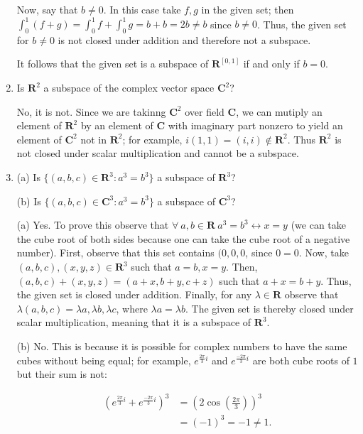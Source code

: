 \documentclass{book}
\begin{document}
\begin{enumerate}
Now, say that \(b \neq 0\).  In this case take \(f,g\) in the given set; then \(\int_{0}^{1} (f+g)=\int_{0}^{1} f+\int_{0}^{1} g=b+b=2b \neq b\) since \(b \neq 0\).  Thus, the given set for \(b \neq 0\) is not closed under addition and therefore not a subspace.

It follows that the given set is a subspace of \(\textbf{R}^{[0,1]}\) if and only if \(b=0\).

\item Is \(\textbf{R}^2\) a subspace of the complex vector space \(\textbf{C}^2\)?

No, it is not.  Since we are takinng \(\textbf{C}^2\) over field \(\textbf{C}\), we can mutiply an element of \(\textbf{R}^2\) by an element of \(\textbf{C}\) with imaginary part nonzero to yield an element of \(\textbf{C}^2\) not in \(\textbf{R}^2\); for example, \(i(1,1)=(i,i) \notin \textbf{R}^2\).  Thus \(\textbf{R}^2\) is not closed under scalar multiplication and  cannot be a subspace.

\item (a) Is \(\{(a,b,c) \in \textbf{R}^3:a^3=b^3\}\) a subspace of \(\textbf{R}^3\)?

(b) Is \(\{(a,b,c) \in \textbf{C}^3:a^3=b^3\}\) a subspace of \(\textbf{C}^3\)?

(a) Yes.  To prove this observe that \(\forall \ a,b \in \textbf{R} \ a^3=b^3 \leftrightarrow x=y\) (we can take the cube root of both sides because one can take the cube root of a negative number).  First, observe that this set contains \((0,0,0\), since \(0=0\).  Now, take \((a,b,c),(x,y,z) \in \textbf{R}^3\) such that \(a=b, x=y\).  Then, \((a,b,c)+(x,y,z)=(a+x,b+y,c+z)\) such that \(a+x=b+y\).  Thus, the given set is closed under addition.  Finally, for any \(\lambda \in \textbf{R}\) observe that \(\lambda(a,b,c)=\lambda{a},\lambda{b},\lambda{c}\), where \(\lambda{a}=\lambda{b}\).  The given set is thereby closed under scalar multiplication, meaning that it is a subspace of \(\textbf{R}^3\).

(b) No.  This is because it is possible for complex numbers to have the same cubes without being equal; for example, \(e^{\frac{2\pi}{3}i}\) and \(e^{\frac{-2\pi}{3}i}\) are both cube roots of \(1\) but their sum is not: 

\begin{equation*}
\begin{split}
    \left( e^{\frac{2\pi}{3}i} + e^{\frac{-2\pi}{3}i} \right)^3 &= \left( 2 \cos\left(\frac{2\pi}{3}\right) \right)^3 \\
    &= (-1)^3 = -1 \neq 1.
\end{split}
\end{equation*}


\end{enumerate}
\end{document}
